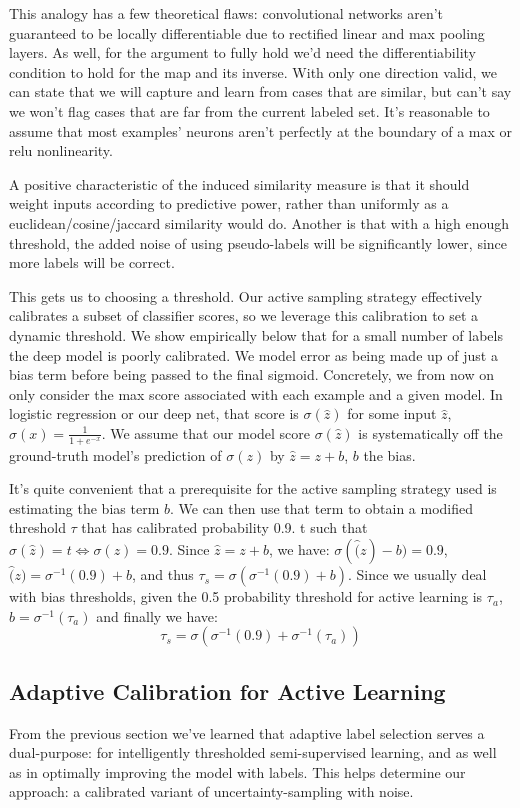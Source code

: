 \documentclass{article}
\begin{document}
This analogy has a few theoretical flaws: convolutional networks aren't guaranteed to be locally differentiable due to rectified linear and max pooling layers.  As well, for the argument to fully hold we'd need the differentiability condition to hold for the map and its inverse.  With only one direction valid, we can state that we will capture and learn from cases that are similar, but can't say we won't flag cases that are far from the current labeled set.  It's reasonable to assume that most examples' neurons aren't perfectly at the boundary of a max or relu nonlinearity. 

A positive characteristic of the induced similarity measure is that it should weight inputs according to predictive power, rather than uniformly as a euclidean/cosine/jaccard similarity would do.  Another is that with a high enough threshold, the added noise of using pseudo-labels will be significantly lower, since more labels will be correct. 

This gets us to choosing a threshold.  Our active sampling strategy effectively calibrates a subset of classifier scores, so we leverage this calibration to set a dynamic threshold.  We show empirically below that for a small number of labels the deep model is poorly calibrated.  We model error as being made up of just a bias term before being passed to the final sigmoid.  Concretely, we from now on only consider the max score associated with each example and a given model.  In logistic regression or our deep net, that score is $\sigma(\hat{z})$ for some input $\hat{z}$, $\sigma(x)=\frac{1}{1+e^{-x}}$.  We assume that our model score $\sigma(\hat{z})$ is systematically off the ground-truth model's prediction of $\sigma(z)$ by $\hat{z}=z+b$, $b$ the bias.  

It's quite convenient that a prerequisite for the active sampling strategy used is estimating the bias term $b$.  We can then use that term to obtain a modified threshold $\tau$ that has calibrated probability 0.9.  t such that $\sigma(\hat{z})=t \iff \sigma(z)=0.9$.  Since $\hat{z}=z+b$, we have:
$\sigma(\hat(z)-b)=0.9$, $\hat(z)=\sigma^{-1}(0.9)+b$, and thus $\tau_s=\sigma(\sigma^{-1}(0.9)+b)$.  Since we usually deal with bias thresholds, given the 0.5 probability threshold for active learning is $\tau_a$, $b=\sigma^{-1}(\tau_a)$ and finally we have:
$$\tau_s=\sigma(\sigma^{-1}(0.9)+\sigma^{-1}(\tau_a))$$

\subsection{Adaptive Calibration for Active Learning}
From the previous section we've learned that adaptive label selection serves a dual-purpose: for intelligently thresholded semi-supervised learning, and as well as in optimally improving the model with labels.  This helps determine our approach: a calibrated variant of uncertainty-sampling with noise. 
\end{document}
